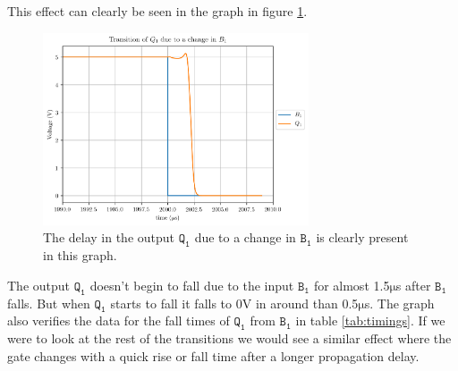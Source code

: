 \documentclass[12pt, titlepage]{article}
\newcommand\Bb{\ensuremath{\mathtt{B_1}}}
\newcommand\Qb{\ensuremath{\mathtt{Q_1}}}
\newcommand\us{$\mathrm{\mu}$s}
\begin{document}
    This effect can clearly be seen in the graph in figure
    \ref{fig:delay}.
    \begin{figure}[H]
        \centering
        \includegraphics[width=0.7\textwidth]{figures/delays.png}
        \caption{The delay in the output $\Qb$ due to a change in $\Bb$
        is clearly present in this graph.}
        \label{fig:delay}
    \end{figure}
    The output $\Qb$ doesn't begin to fall due to the input $\Bb$ for
    almost 1.5\us{} after $\Bb$ falls. But when $\Qb$ starts to fall it
    falls to 0V in around than 0.5\us. The graph also verifies the data
    for the fall times of $\Qb$ from $\Bb$ in table \ref{tab:timings}.
    If we were to look at the rest of the transitions we would see a
    similar effect where the gate changes with a quick rise or fall time
    after a longer propagation delay.
\end{document}
